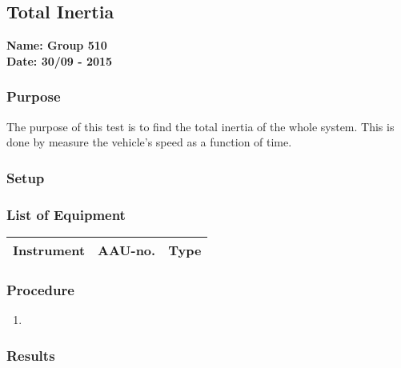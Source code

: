 \pagebreak
\subsection{Total Inertia} %
\textbf{Name: Group 510}\\
\textbf{Date: 30/09 - 2015}

\subsubsection{Purpose}
The purpose of this test is to find the total inertia of the whole system. This is done by measure the vehicle's speed as a function of time.

\subsubsection{Setup}

\subsubsection{List of Equipment}

\begin{table}[H]
\begin{tabular}{|l|l|p{4cm}|}
\hline%
  \textbf{Instrument}                        &  \textbf{AAU-no.}  &  \textbf{Type}       \\
\hline%
\end{tabular}
\end{table}

\subsubsection{Procedure}

\begin{enumerate}
  \item 
\end{enumerate}

\subsubsection{Results}


